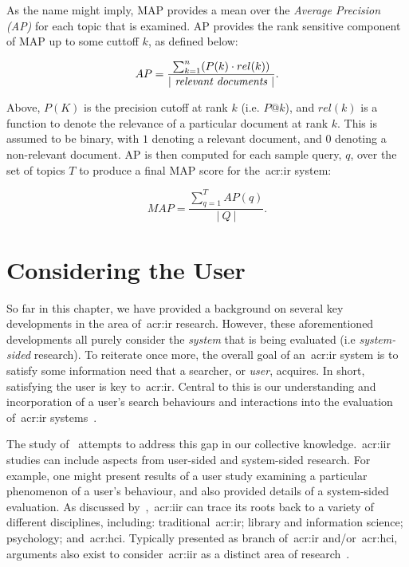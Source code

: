 As the name might imply, MAP provides a mean over the \emph{Average Precision (AP)} for each topic that is examined. AP provides the rank sensitive component of MAP up to some cuttoff $k$, as defined below:

\begin{equation*}
AP = \frac{\sum^{n}_{k=1}(P(k) \cdot rel(k))}{|~\text{\emph{relevant documents}}~|}.
\end{equation*}

Above, $P(K)$ is the precision cutoff at rank $k$ (i.e. $P@k$), and $rel(k)$ is a function to denote the relevance of a particular document at rank $k$. This is assumed to be binary, with $1$ denoting a relevant document, and $0$ denoting a non-relevant document. AP is then computed for each sample query, $q$, over the set of topics $T$ to produce a final MAP score for the~\gls{acr:ir} system:

\begin{equation*}
MAP = \frac{\sum^{T}_{q=1} AP(q)}{|~Q~|}.
\end{equation*}


\section{Considering the User}\label{sec:ir_background:user}
So far in this chapter, we have provided a background on several key developments in the area of~\gls{acr:ir} research. However, these aforementioned developments all purely consider the \emph{system} that is being evaluated (i.e \emph{system-sided} research). To reiterate once more, the overall goal of an~\gls{acr:ir} system is to satisfy some information need that a searcher, or \emph{user}, acquires. In short, satisfying the user is key to~\gls{acr:ir}. Central to this is our understanding and incorporation of a user's search behaviours and interactions into the evaluation of~\gls{acr:ir} systems~\citep{callan2007minds}.

The study of~ attempts to address this gap in our collective knowledge.~\gls{acr:iir} studies can include aspects from user-sided and system-sided research. For example, one might present results of a user study examining a particular phenomenon of a user's behaviour, and also provided details of a system-sided evaluation. As discussed by~\cite{kelly2009iir},~\gls{acr:iir} can trace its roots back to a variety of different disciplines, including: traditional~\gls{acr:ir}; library and information science; psychology; and~\gls{acr:hci}. Typically presented as branch of~\gls{acr:ir} and/or~\gls{acr:hci}, arguments also exist to consider~\gls{acr:iir} as a distinct area of research~\citep{ruthven2008iir}.

